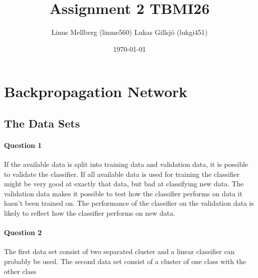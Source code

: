 \documentclass[a4paper,12pt]{article}
\begin{document}
\title{Assignment 2 TBMI26}
\author{Linus Mellberg (linme560) Lukas Gillsjö (lukgi451)}
\date{\today}
\maketitle
\pagebreak
\thispagestyle{tcr}
\pagestyle{tcr}

\section{Backpropagation Network}
\subsection{The Data Sets}
\paragraph{Question 1}

If the available data is split into training data and validation data, it is possible to validate the classifier.
If all available data is used for training the classifier might be very good at exactly that data, but bad at classifying new data.
The validation data makes it possible to test how the classifier performs on data it hasn't been trained on.
The performance of the classifier on the validation data is likely to reflect how the classifier performs on new data.

\paragraph{Question 2}

The first data set consist of two separated cluster and a linear classifier can probably be used.
The second data set consist of a cluster of one class with the other class 
\end{document}
